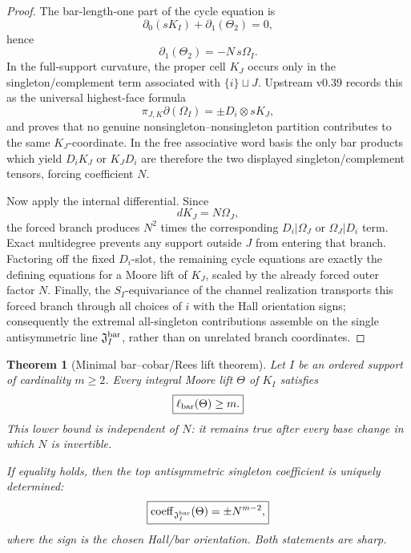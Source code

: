 \documentclass[11pt]{article}
\newtheorem{theorem}{Theorem}[section]
\theoremstyle{remark}
\begin{document}
\begin{proof}
The bar-length-one part of the cycle equation is
\[
 \partial_0(sK_I)+\partial_1(\Theta_2)=0,
\]
hence
\[
 \partial_1(\Theta_2)=-N\,s\Omega_I.
\]
In the full-support curvature, the proper cell \(K_J\) occurs only in the
singleton/complement term associated with \(\{i\}\sqcup J\).  Upstream v0.39
records this as the universal highest-face formula
\[
 \pi_{J,K}\partial(\Omega_I)
 =
 \pm D_i\otimes sK_J,
\]
and proves that no genuine nonsingleton--nonsingleton partition contributes
to the same \(K_J\)-coordinate.  In the free associative word basis the only
bar products which yield \(D_iK_J\) or \(K_JD_i\) are therefore the two
displayed singleton/complement tensors, forcing coefficient \(N\).

Now apply the internal differential.  Since
\[
 dK_J=N\Omega_J,
\]
the forced branch produces \(N^2\) times the corresponding
\(D_i|\Omega_J\) or \(\Omega_J|D_i\) term.  Exact multidegree prevents any
support outside \(J\) from entering that branch.  Factoring off the fixed
\(D_i\)-slot, the remaining cycle equations are exactly the defining
equations for a Moore lift of \(K_J\), scaled by the already forced outer
factor \(N\).  Finally, the \(S_I\)-equivariance of the channel realization
transports this forced branch through all choices of \(i\) with the Hall
orientation signs; consequently the extremal all-singleton contributions
assemble on the single antisymmetric line
\(\mathfrak J_I^{\rm bar}\), rather than on unrelated branch coordinates.
\end{proof}

\begin{theorem}[Minimal bar--cobar/Rees lift theorem]
\label{P2M-thm:v28-minimal-moore-lift}
Let \(I\) be an ordered support of cardinality \(m\ge2\).  Every integral
Moore lift \(\Theta\) of \(K_I\) satisfies
\begin{equation}
 \boxed{\ell_{\rm bar}(\Theta)\ge m.}
\end{equation}
This lower bound is independent of \(N\): it remains true after every base
change in which \(N\) is invertible.

If equality holds, then the top antisymmetric singleton coefficient is
uniquely determined:
\begin{equation}
 \boxed{
 \operatorname{coeff}_{\mathfrak J_I^{\rm bar}}(\Theta)
 =
 \pm N^{m-2},}
\end{equation}
where the sign is the chosen Hall/bar orientation.  Both statements are
sharp.
\end{theorem}
\end{document}
